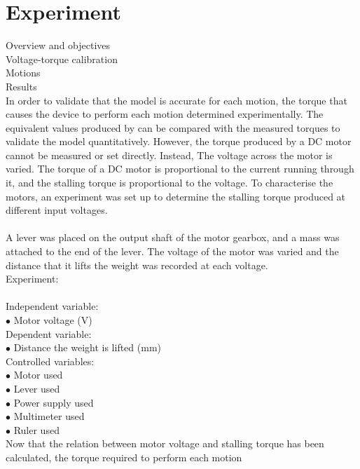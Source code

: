 \chapter{Experiment}

Overview and objectives\\
Voltage-torque calibration\\
Motions\\
Results\\





In order to validate that the model is accurate for each motion, the torque that causes the device to perform each motion determined experimentally. The equivalent values produced by can be compared with the measured torques to validate the model quantitatively. However, the torque produced by a DC motor cannot be measured or set directly. Instead, The voltage across the motor is varied. The torque of a DC motor is proportional to the current running through it, and the stalling torque is proportional to the voltage. To characterise the motors, an experiment was set up to determine the stalling torque produced at different input voltages. \\
\\
A lever was placed on the output shaft of the motor gearbox, and a mass was attached to the end of the lever. The voltage of the motor was varied and the distance that it lifts the weight was recorded at each voltage.\\
Experiment:\\\\

Independent variable:\\
$\bullet$ Motor voltage (V)\\
Dependent variable:\\
$\bullet$ Distance the weight is lifted (mm)\\
Controlled variables:\\
$\bullet$ Motor used\\
$\bullet$ Lever used\\
$\bullet$ Power supply used\\
$\bullet$ Multimeter used\\
$\bullet$ Ruler used\\


Now that the relation between motor voltage and stalling torque has been calculated, the torque required to perform each motion 